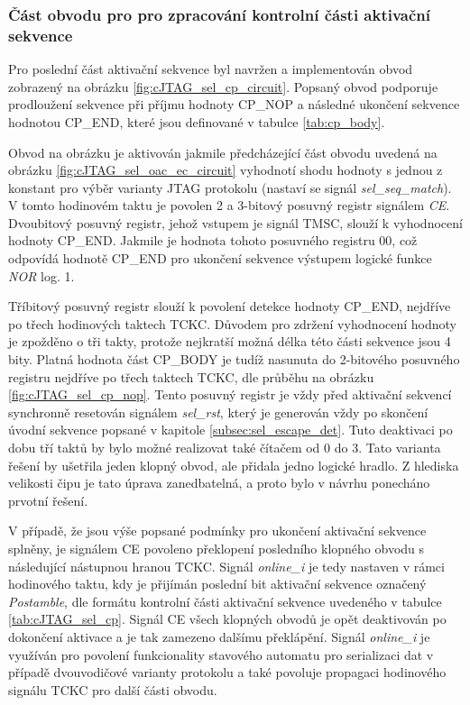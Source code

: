 \subsubsection{Část obvodu pro pro zpracování kontrolní části aktivační sekvence}
Pro poslední část aktivační sekvence byl navržen a implementován obvod zobrazený na obrázku \ref{fig:cJTAG_sel_cp_circuit}. Popsaný obvod podporuje prodloužení sekvence při příjmu hodnoty CP\_NOP a následné ukončení sekvence hodnotou CP\_END, které jsou definované v tabulce \ref{tab:cp_body}. %

Obvod na obrázku je aktivován jakmile předcházející část obvodu uvedená na obrázku \ref{fig:cJTAG_sel_oac_ec_circuit} vyhodnotí shodu hodnoty s jednou z konstant pro výběr varianty \acs{JTAG} protokolu (nastaví se signál \textit{sel\_seq\_match}). V tomto hodinovém taktu je povolen 2 a 3-bitový posuvný registr signálem \textit{CE}. Dvoubitový posuvný registr, jehož vstupem je signál \acs{TMSC}, slouží k vyhodnocení hodnoty CP\_END. Jakmile je hodnota tohoto posuvného registru 00, což odpovídá hodnotě CP\_END pro ukončení sekvence výstupem logické funkce \textit{NOR} log. 1.

Tříbitový posuvný registr slouží k povolení detekce hodnoty CP\_END, nejdříve po třech hodinových taktech \acs{TCKC}. Důvodem pro zdržení vyhodnocení hodnoty je zpožděno o tři takty, protože nejkratší možná délka této části sekvence jsou 4 bity. Platná hodnota část CP\_BODY je tudíž nasunuta do 2-bitového posuvného registru nejdříve po třech taktech \acs{TCKC}, dle průběhu na obrázku \ref{fig:cJTAG_sel_cp_nop}. Tento posuvný registr je vždy před aktivační sekvencí synchronně resetován signálem \textit{sel\_rst}, který je generován vždy po skončení úvodní sekvence popsané v kapitole \ref{subsec:sel_escape_det}. Tuto deaktivaci po dobu tří taktů by bylo možné realizovat také čítačem od 0 do 3. Tato varianta řešení by ušetřila jeden klopný obvod, ale přidala jedno logické hradlo. Z hlediska velikosti čipu je tato úprava zanedbatelná, a proto bylo v návrhu ponecháno prvotní řešení.

V případě, že jsou výše popsané podmínky pro ukončení aktivační sekvence splněny, je signálem CE povoleno překlopení posledního klopného obvodu s následující nástupnou hranou \acs{TCKC}. Signál \textit{online\_i} je tedy nastaven v rámci hodinového taktu, kdy je přijímán poslední bit aktivační sekvence označený \textit{Postamble}, dle formátu kontrolní části aktivační sekvence uvedeného v tabulce \ref{tab:cJTAG_sel_cp}. Signál CE všech klopných obvodů je opět deaktivován po dokončení aktivace a je tak zamezeno dalšímu překlápění. Signál \textit{online\_i} je využíván pro povolení funkcionality stavového automatu pro serializaci dat v případě dvouvodičové varianty protokolu a také povoluje propagaci hodinového signálu \acs{TCKC} pro další části obvodu. 

